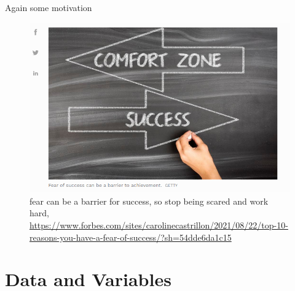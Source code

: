 \documentclass[8pt, usepdftitle=false]{beamer}
\begin{document}
\begin{frame}{Again some motivation}
  

    
    \begin{figure}
    \includegraphics[scale = .3]{Images/fear_not.png}
    \caption{fear can be a barrier for success, so stop being scared and work hard, \url{https://www.forbes.com/sites/carolinecastrillon/2021/08/22/top-10-reasons-you-have-a-fear-of-success/?sh=54dde6da1c15}}
      
    \end{figure}


\end{frame}



\section[DataVariable]{Data and Variables}
\frame{\sectionpage}
\end{document}
